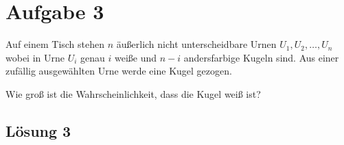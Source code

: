 \documentclass[main.tex]{subfiles}
\begin{document}
\section{Aufgabe 3}
Auf einem Tisch stehen $n$ äußerlich nicht unterscheidbare Urnen $U_1, U_2, \ldots, U_n$ wobei in Urne $U_i$ genau $i$ weiße und $n - i$ andersfarbige Kugeln sind. Aus einer zufällig ausgewählten Urne werde eine Kugel gezogen.

Wie groß ist die Wahrscheinlichkeit, dass die Kugel weiß ist?

\subsection{Lösung 3}
\end{document}

